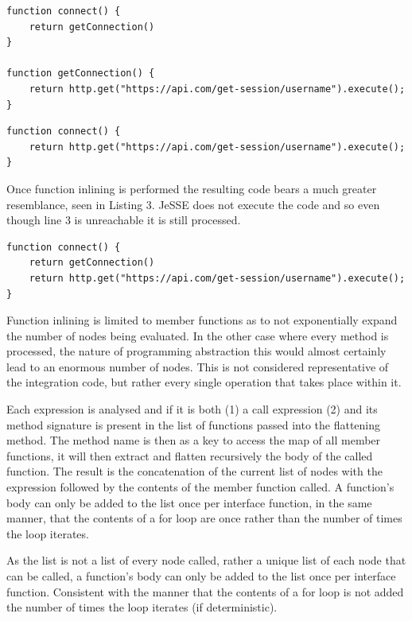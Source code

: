\documentclass[jou,apacite]{apa6}
\begin{document}
\begin{lstlisting}[caption=Function returning call expression]
function connect() {
	return getConnection()
}

function getConnection() {
	return http.get("https://api.com/get-session/username").execute();
}
\end{lstlisting}

\begin{lstlisting}[caption=Function returning contents of previous call expression]
function connect() {
	return http.get("https://api.com/get-session/username").execute();
}
\end{lstlisting}

Once function inlining is performed the resulting code bears a much greater resemblance, seen in Listing 3. JeSSE does not execute the code and so even though line 3 is unreachable it is still processed.

\begin{lstlisting}[caption=Function returning contents of previous call expression]
function connect() {
	return getConnection()
	return http.get("https://api.com/get-session/username").execute();
}
\end{lstlisting}

Function inlining is limited to member functions as to not exponentially expand the number of nodes being evaluated. In the other case where every method is processed,  the nature of programming abstraction this would almost certainly lead to an enormous number of nodes. This is not considered representative of the integration code, but rather every single operation that takes place within it. 

Each expression is analysed and if it is both (1) a call expression (2) and its method signature is present in the list of functions passed into the flattening method. The method name is then as a key to access the map of all member functions, it will then extract and flatten recursively the body of the called function. The result is the concatenation of the current list of nodes with the expression followed by the contents of the member function called. A function’s body can only be added to the list once per interface function, in the same manner, that the contents of a for loop are once rather than the number of times the loop iterates. 

As the list is not a list of every node called, rather a unique list of each node that can be called, a function’s body can only be added to the list once per interface function. Consistent with the manner that the contents of a for loop is not added the number of times the loop iterates (if deterministic).
\end{document}
